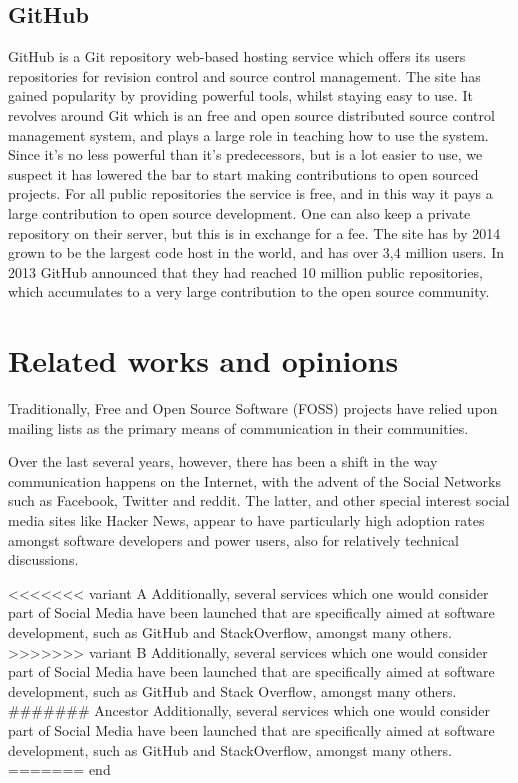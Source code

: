 \documentclass[a4paper,11pt]{article} %
\begin{document}
\subsection{GitHub}

GitHub is a Git repository web-based hosting service which offers its users
repositories for revision control and source control management. The site
has gained popularity by providing powerful tools, whilst staying easy to
use. It revolves around Git which is an free and open source distributed
source control management system, and plays a large role in teaching how to
use the system. Since it’s no less powerful than it’s predecessors, but is a
lot easier to use, we suspect it has lowered the bar to start making
contributions to open sourced projects. For all public repositories the
service is free, and in this way it pays a large contribution to open source
development. One can also keep a private repository on their server, but
this is in exchange for a fee. The site has by 2014 grown to be the largest
code host in the world, and has over 3,4 million users. In 2013 GitHub
announced that they had reached 10 million public repositories, which
accumulates to a very large contribution to the open source community.

\section{Related works and opinions}

Traditionally, Free and Open Source Software (FOSS) projects have
relied upon mailing lists as the primary means of communication in
their communities. %

Over the last several years, however, there has been a shift in the way
communication happens on the Internet, with the advent of the Social
Networks such as Facebook, Twitter and reddit. The latter, and other special
interest social media sites like Hacker News, appear to have particularly
high adoption rates amongst software developers and power users, also for
relatively technical discussions.

<<<<<<< variant A
Additionally, several services which one would consider part of Social Media
have been launched that are specifically aimed at software development, such
as GitHub and StackOverflow, amongst many others.
>>>>>>> variant B
Additionally, several services which one would consider part of Social
Media have been launched that are specifically aimed at software
development, such as GitHub and Stack Overflow, amongst many others.
####### Ancestor
Additionally, several services which one would consider part of Social
Media have been launched that are specifically aimed at software
development, such as GitHub and StackOverflow, amongst many others.
======= end
\end{document}
